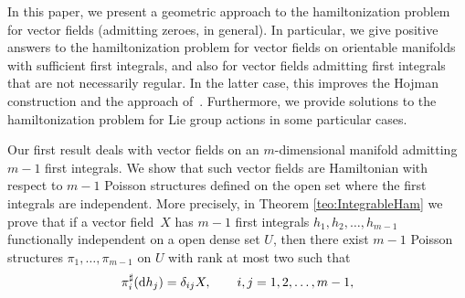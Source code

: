 \documentclass[10pt,a4paper]{amsart}
\newcommand{\dd}{{\rm d}}
\numberwithin{equation}{section}
\begin{document}
In this paper, we present a geometric approach to the hamiltonization problem for vector fields (admitting zeroes, in general). In particular, we give positive answers to the hamiltonization problem for vector fields on orientable manifolds with sufficient first integrals, and also for vector fields admitting first integrals that are not necessarily regular. In the latter case, this improves the Hojman construction and the approach of~\cite{AHA-06}. Furthermore, we provide solutions to the hamiltonization problem for Lie group actions in some particular cases.

Our first result deals with vector fields on an $m$-dimensional manifold admitting $m-1$ first integrals. We show that such vector fields are Hamiltonian with respect to $m-1$ Poisson structures defined on the open set where the first integrals are independent.
More precisely, in Theorem \ref{teo:IntegrableHam} we prove that if a vector field~$X$ has $m-1$ first integrals $h_1,h_2,\dots, h_{m-1}$ functionally independent on a open dense set $U$, then there exist $m-1$ Poisson structures $\pi_1,\dots, \pi_{m-1}$ on $U$ with rank at most two such that
 \begin{equation*}
 \pi_i^\sharp(\dd h_j)=\delta_{ij}X,\qquad
 i,j=1,2,\dots, m-1,
 \end{equation*}
\end{document}
